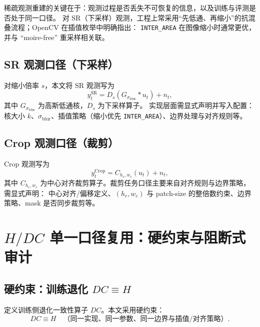 稀疏观测重建的关键在于：观测过程是否丢失不可恢复的信息，以及训练与评测是否处于同一口径。
对 SR（下采样）观测，工程上常采用“先低通、再缩小”的抗混叠流程；OpenCV 在插值枚举中明确指出：
\texttt{INTER\_AREA} 在图像缩小时通常更优，并与 ``moire-free'' 重采样相关联。

\subsection{SR 观测口径（下采样）}
\label{subsec:sr_protocol}

对缩小倍率 $s$，本文将 SR 观测写为
\begin{equation}
y^{\mathrm{SR}}_t = D_s\!\left(G_{\sigma_{\mathrm{blur}}} * u_t\right) + n_t,
\label{eq:sr_obs}
\end{equation}
其中 $G_{\sigma_{\mathrm{blur}}}$ 为高斯低通核，$D_s$ 为下采样算子。
实现层面需显式声明并写入配置：核大小 $k$、$\sigma_{\mathrm{blur}}$、插值策略（缩小优先 \texttt{INTER\_AREA}）、边界处理与对齐规则等。

\subsection{Crop 观测口径（裁剪）}
\label{subsec:crop_protocol}

Crop 观测写为
\begin{equation}
y^{\mathrm{Crop}}_t = C_{h_c,w_c}(u_t) + n_t,
\label{eq:crop_obs}
\end{equation}
其中 $C_{h_c,w_c}$ 为中心对齐裁剪算子。裁剪任务口径主要来自对齐规则与边界策略，需显式声明：
中心对齐/偏移定义、$(h_c,w_c)$ 与 patch-size 的整倍数约束、边界策略、mask 是否同步裁剪等。

\section{\texorpdfstring{$H/DC$}{H/DC} 单一口径复用：硬约束与阻断式审计}
\label{sec:H_DC_audit}

\subsection{硬约束：训练退化 \texorpdfstring{$DC\equiv H$}{DC=H}}
\label{subsec:DC_equals_H}

定义训练侧退化一致性算子 $DC$。本文采用硬约束：
\begin{equation}
DC \equiv H \quad \text{（同一实现、同一参数、同一边界与插值/对齐策略）}.
\label{eq:DCeqH}
\end{equation}

